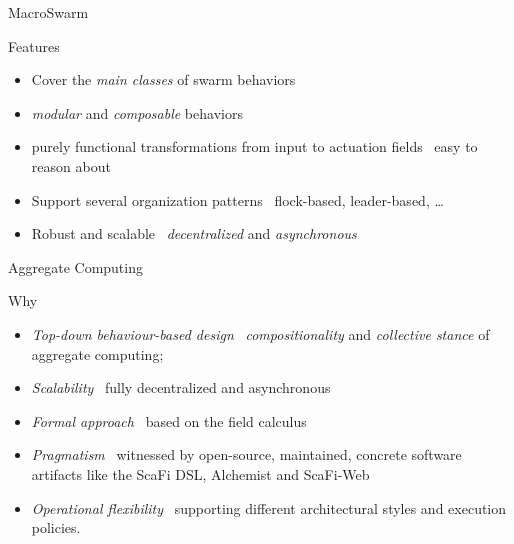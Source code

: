\documentclass[presentation, 9pt]{beamer}\mode<presentation>{\usetheme{AMSBolognaFC}}
\begin{document}
\begin{frame}{MacroSwarm}
\begin{alertblock}{Features}
	\begin{itemize}
		\item Cover the \emph{main classes} of swarm behaviors
		\item \emph{modular} and \emph{composable} behaviors
		\item purely functional transformations from input to actuation fields \faArrowRight \, easy to reason about
		\item Support several organization patterns \faArrowRight \, flock-based, leader-based, \dots
		\item Robust and scalable \faArrowRight \, \emph{decentralized} and \emph{asynchronous}
	\end{itemize}
\end{alertblock}
\end{frame}
\begin{frame}[allowframebreaks]{Aggregate Computing}

\begin{block}{Why}
\begin{itemize}
	\item \emph{Top-down behaviour-based design} \faArrowRight \, \emph{compositionality} and \emph{collective stance} of aggregate computing;
	\item \emph{Scalability} \faArrowRight \, fully decentralized and asynchronous
	\item \emph{Formal approach} \faArrowRight \, based on the field calculus
		
	\item \emph{Pragmatism} \faArrowRight \, witnessed by open-source, maintained, concrete software artifacts like the ScaFi DSL, Alchemist and {\sc{}ScaFi-Web}
	\item \emph{Operational flexibility} \faArrowRight \, supporting different architectural styles and execution policies.
\end{itemize}

\end{block}

\end{frame}
\end{document}
